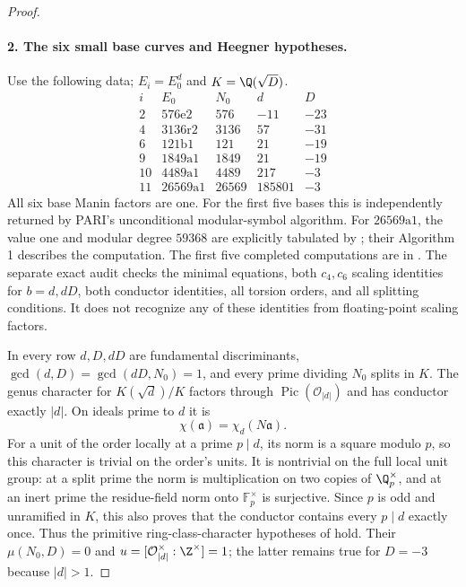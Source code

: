 \begin{proof}
\paragraph{2. The six small base curves and Heegner hypotheses.}
Use the following data; $E_i=E_0^d$ and $K=\Q(\sqrt D)$.
\[
\begin{array}{c|c|r|r|r}
 i&E_0&N_0&d&D\\\hline
 2&576\mathrm e2&576&-11&-23\\
 4&3136\mathrm r2&3136&57&-31\\
 6&121\mathrm b1&121&21&-19\\
 9&1849\mathrm a1&1849&21&-19\\
 10&4489\mathrm a1&4489&217&-3\\
 11&26569\mathrm a1&26569&185801&-3
\end{array}
\]
All six base Manin factors are one. For the first five bases this
is independently returned by PARI's unconditional modular-symbol
algorithm. For $26569\mathrm a1$, the value one and modular degree
$59368$ are explicitly tabulated by
\citet[Appendix B, p.~102, unnumbered $26569\mathrm a1/26569\mathrm a2$
block]{CgzBelabas2019}; their Algorithm 1 describes the computation.
The first five completed computations are in
. The separate exact audit
 checks the minimal equations,
both $c_4,c_6$ scaling identities for $b=d,dD$, both conductor
identities, all torsion orders, and all splitting conditions. It
does not recognize any of these identities from floating-point
scaling factors.

In every row $d,D,dD$ are fundamental discriminants,
$\gcd(d,D)=\gcd(dD,N_0)=1$, and every prime dividing $N_0$ splits
in $K$. The genus character for $K(\sqrt d)/K$ factors through
$\operatorname{Pic}(\mathcal O_{|d|})$ and has conductor exactly
$|d|$. On ideals prime to $d$ it is
\[
 \chi(\mathfrak a)=\chi_d(N\mathfrak a).
\]
For a unit of the order locally at a prime $p\mid d$, its norm is
a square modulo $p$, so this character is trivial on the order's
units. It is nontrivial on the full local unit group: at a split
prime the norm is multiplication on two copies of $\Q_p^\times$,
and at an inert prime the residue-field norm onto $\mathbb F_p^\times$
is surjective. Since $p$ is odd and unramified in $K$, this also
proves that the conductor contains every $p\mid d$ exactly once.
Thus the primitive ring-class-character hypotheses of
\citet[Theorem 1.1, pp.~2524--2525]{CgzCai2014} hold. Their
$\mu(N_0,D)=0$ and
$u=[\mathcal O_{|d|}^{\times}:\Z^{\times}]=1$; the latter remains
true for $D=-3$ because $|d|>1$.


\end{proof}
